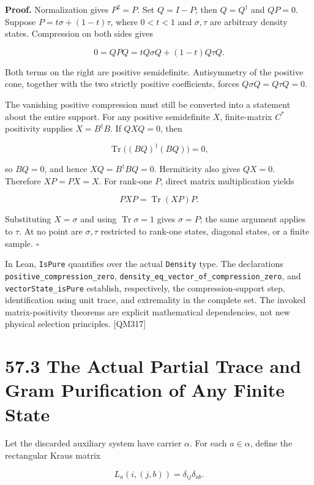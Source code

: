 \documentclass[
  11pt,
  oneside]{book}
\begin{document}
\textbf{Proof.} Normalization gives \(P^2=P\). Set \(Q=I-P\); then
\(Q=Q^\dagger\) and \(QP=0\). Suppose \(P=t\sigma+(1-t)\tau\), where
\(0<t<1\) and \(\sigma,\tau\) are arbitrary density states. Compression
on both sides gives

\[
0=QPQ=tQ\sigma Q+(1-t)Q\tau Q.
\]

Both terms on the right are positive semidefinite. Antisymmetry of the
positive cone, together with the two strictly positive coefficients,
forces \(Q\sigma Q=Q\tau Q=0\).

The vanishing positive compression must still be converted into a
statement about the entire support. For any positive semidefinite \(X\),
finite-matrix \(C^*\) positivity supplies \(X=B^\dagger B\). If
\(QXQ=0\), then

\[
\operatorname{Tr}\bigl((BQ)^\dagger(BQ)\bigr)=0,
\]

so \(BQ=0\), and hence \(XQ=B^\dagger BQ=0\). Hermiticity also gives
\(QX=0\). Therefore \(XP=PX=X\). For rank-one \(P\), direct matrix
multiplication yields

\[
PXP=\operatorname{Tr}(XP)P.
\]

Substituting \(X=\sigma\) and using \(\operatorname{Tr}\sigma=1\) gives
\(\sigma=P\); the same argument applies to \(\tau\). At no point are
\(\sigma,\tau\) restricted to rank-one states, diagonal states, or a
finite sample. \(\square\)

In Lean, \texttt{Is\allowbreak Pure} quantifies over the actual \texttt{Density}
type. The declarations \texttt{positive\_\allowbreak compression\_\allowbreak zero},
\texttt{density\_\allowbreak eq\_\allowbreak vector\_\allowbreak of\_\allowbreak compression\_\allowbreak zero}, and
\texttt{vector\allowbreak State\_\allowbreak is\allowbreak Pure} establish, respectively, the
compression-support step, identification using unit trace, and
extremality in the complete set. The invoked matrix-positivity theorems
are explicit mathematical dependencies, not new physical selection
principles. {[}QM317{]}

\section{57.3 The Actual Partial Trace and Gram Purification of Any
Finite State}

Let the discarded auxiliary system have carrier \(\alpha\). For each
\(a\in\alpha\), define the rectangular Kraus matrix

\[
L_a(i,(j,b))=\delta_{ij}\delta_{ab}.
\]
\end{document}
